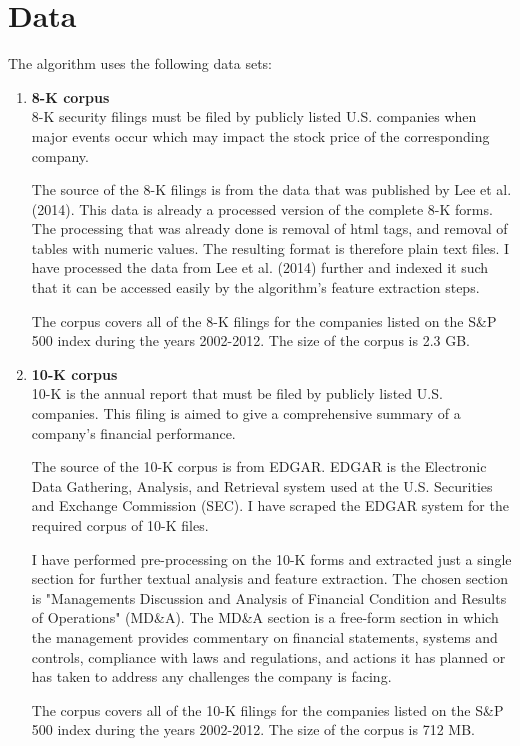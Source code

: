 \documentclass[11pt,a4paper]{article}
\begin{document}
\section{Data}
The algorithm uses the following data sets:
\begin{enumerate}
  \item \textbf{8-K corpus} \\
8-K security filings must be filed by publicly listed U.S. companies when major events occur which may impact the stock price of the corresponding company.

The source of the 8-K filings is from the data that was published by Lee et al. (2014). This data is already a processed version of the complete 8-K forms. The processing that was already done is removal of html tags, and removal of tables with numeric values. The resulting format is therefore plain text files. I have processed the data from Lee et al. (2014) further and indexed it such that it can be accessed easily by the algorithm's feature extraction steps.

The corpus covers all of the 8-K filings for the companies listed on the S\&P 500 index during the years 2002-2012. The size of the corpus is 2.3 GB.

  \item \textbf{10-K corpus} \\
  10-K is the annual report that must be filed by publicly listed U.S. companies. This filing is aimed to give a comprehensive summary of a company's financial performance.
  
  The source of the 10-K corpus is from EDGAR. EDGAR is the Electronic Data Gathering, Analysis, and Retrieval system used at the U.S. Securities and Exchange Commission (SEC). I have scraped the EDGAR system for the required corpus of 10-K files.
  
  I have performed pre-processing on the 10-K forms and extracted just a single section for further textual analysis and feature extraction. The chosen section is "Managements Discussion and Analysis of Financial Condition and Results of Operations" (MD\&A). The MD\&A section is a free-form section in which the management provides commentary on financial statements, systems and controls, compliance with laws and regulations, and actions it has planned or has taken to address any challenges the company is facing.
  
  The corpus covers all of the 10-K filings for the companies listed on the S\&P 500 index during the years 2002-2012. The size of the corpus is 712 MB.
  

\end{enumerate}
\end{document}
